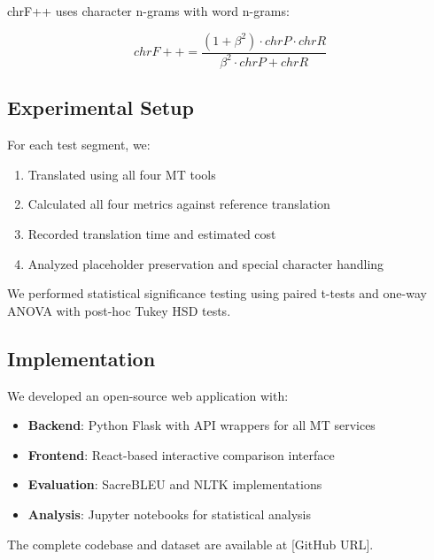 chrF++ \cite{popovic2017chrf} uses character n-grams with word n-grams:

\begin{equation}
chrF++ = \frac{(1 + \beta^2) \cdot chrP \cdot chrR}{\beta^2 \cdot chrP + chrR}
\end{equation}

\subsection{Experimental Setup}

For each test segment, we:

\begin{enumerate}
    \item Translated using all four MT tools
    \item Calculated all four metrics against reference translation
    \item Recorded translation time and estimated cost
    \item Analyzed placeholder preservation and special character handling
\end{enumerate}

We performed statistical significance testing using paired t-tests and one-way ANOVA with post-hoc Tukey HSD tests.

\subsection{Implementation}

We developed an open-source web application with:

\begin{itemize}
    \item \textbf{Backend}: Python Flask with API wrappers for all MT services
    \item \textbf{Frontend}: React-based interactive comparison interface
    \item \textbf{Evaluation}: SacreBLEU \cite{post2018call} and NLTK implementations
    \item \textbf{Analysis}: Jupyter notebooks for statistical analysis
\end{itemize}

The complete codebase and dataset are available at [GitHub URL].
